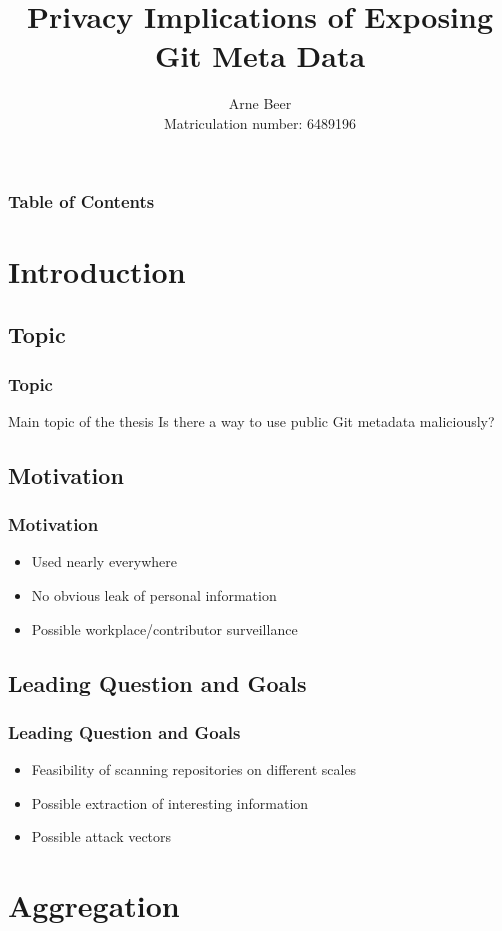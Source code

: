 \documentclass{beamer}
\title[Privacy Implications of Exposing Git Metadata]
{Privacy Implications of Exposing Git Meta Data}
\author[Beer]{Arne Beer \\ \footnotesize Matriculation number: 6489196}
\institute[University of Hamburg]{
    Department of Computer Science\\
    University of Hamburg
}
\begin{document}
\frame{\titlepage}
\begin{frame}
    \frametitle{Table of Contents}
    \footnotesize
    \tableofcontents
\end{frame}

\section{Introduction}

\subsection{Topic}
\begin{frame}
    \frametitle{Topic}
    \begin{block}{Main topic of the thesis}
        Is there a way to use public Git metadata maliciously?
    \end{block}
\end{frame}

\subsection{Motivation}
\begin{frame}
    \frametitle{Motivation}
    \begin{itemize}
        \item Used nearly everywhere
        \pause{}
        \item No obvious leak of personal information
        \pause{}
        \item Possible workplace/contributor surveillance
    \end{itemize}
\end{frame}

\subsection{Leading Question and Goals}
\begin{frame}
    \frametitle{Leading Question and Goals}
    \begin{itemize}
        \item Feasibility of scanning repositories on different scales
        \item Possible extraction of interesting information
        \item Possible attack vectors
    \end{itemize}
\end{frame}

\section{Aggregation}
\end{document}
